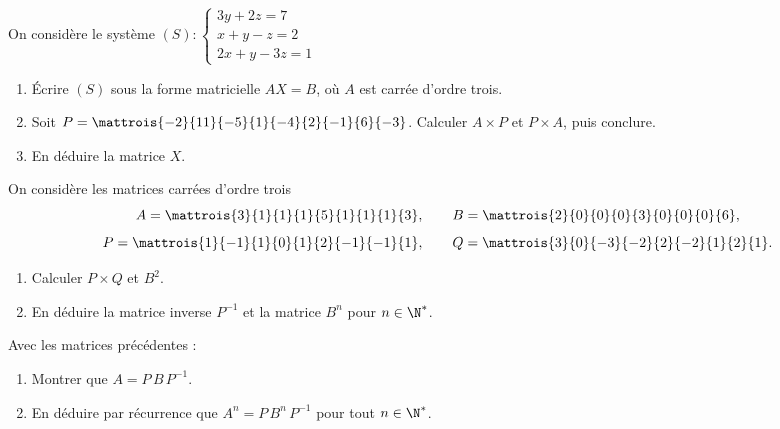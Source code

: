 \begin{annales}
On considère le système
$(S) : \begin{cases} 3y+2z = 7 \\ x+y-z = 2 \\ 2x+y-3z = 1 \end{cases}$
\begin{enumerate}[label=\textbf{\arabic*)}, leftmargin=*, itemsep=0.15em]
  \item Écrire $(S)$ sous la forme matricielle $AX = B$, où $A$ est carrée
        d'ordre trois.
  \item Soit $P = \mattrois{-2}{11}{-5}{1}{-4}{2}{-1}{6}{-3}$. Calculer
        $A \times P$ et $P \times A$, puis conclure.
  \item En déduire la matrice $X$.
\end{enumerate}

On considère les matrices carrées d'ordre trois
\[
  A = \mattrois{3}{1}{1}{1}{5}{1}{1}{1}{3}, \qquad
  B = \mattrois{2}{0}{0}{0}{3}{0}{0}{0}{6},
\]
\[
  P = \mattrois{1}{-1}{1}{0}{1}{2}{-1}{-1}{1}, \qquad
  Q = \mattrois{3}{0}{-3}{-2}{2}{-2}{1}{2}{1}.
\]
\begin{enumerate}[label=\textbf{\alph*)}, leftmargin=*, itemsep=0.15em]
  \item Calculer $P \times Q$ et $B^{2}$.
  \item En déduire la matrice inverse $P^{-1}$ et la matrice $B^{n}$ pour
        $n \in \N^{*}$.
\end{enumerate}

Avec les matrices précédentes :
\begin{enumerate}[label=\textbf{\alph*)}, leftmargin=*, itemsep=0.15em]
  \item Montrer que $A = P\,B\,P^{-1}$.
  \item En déduire par récurrence que $A^{n} = P\,B^{n}\,P^{-1}$ pour tout
        $n \in \N^{*}$.
\end{enumerate}
\end{annales}

